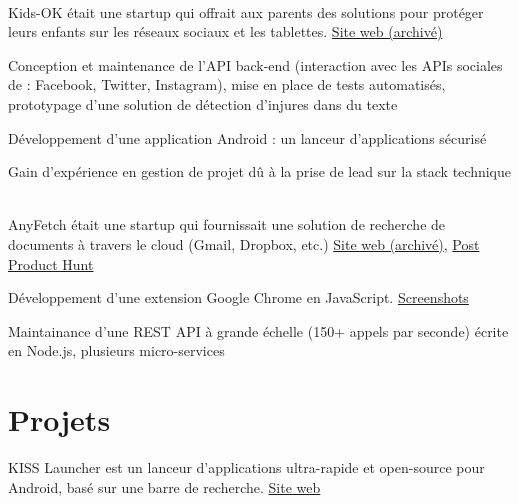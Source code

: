 \documentclass[
  french,
  a4paper
]{resume-openfont}
\begin{document}
\begin{minipage}[t]{0.66\textwidth}
%
%
\\
Kids-OK était une startup qui offrait aux parents des solutions pour protéger leurs enfants sur les réseaux sociaux et les tablettes. \href{https://i.imgur.com/ZAXWuZN.png}{Site web (archivé)}
\vspace{\topsep}
\begin{tightemize}
\item Conception et maintenance de l'API back-end (interaction avec les APIs sociales de : Facebook, Twitter, Instagram), mise en place de tests automatisés, prototypage d'une solution de détection d'injures dans du texte
\item Développement d'une application Android : un lanceur d'applications sécurisé
\item Gain d'expérience en gestion de projet dû à la prise de lead sur la stack technique
\end{tightemize}
\sectionsep

%
%
\\
AnyFetch était une startup qui fournissait une solution de recherche de documents à travers le cloud (Gmail, Dropbox, etc.) \href{https://i.imgur.com/B3MMD6Y.png}{Site web (archivé)}, \href{https://www.producthunt.com/posts/anyfetch}{Post Product Hunt}
\vspace{\topsep}
\begin{tightemize}
\item Développement d'une extension Google Chrome en JavaScript. \href{https://i.imgur.com/yql5v1z.png}{Screenshots}
\item Maintainance d'une REST API à grande échelle (150+ appels par seconde) écrite en Node.js, plusieurs micro-services
\end{tightemize}


\section{Projets}
%
%
KISS Launcher est un lanceur d'applications ultra-rapide et open-source pour Android, basé sur une barre de recherche. \href{http://kisslauncher.com/}{Site web}
\sectionsep


\end{minipage}
\end{document}
